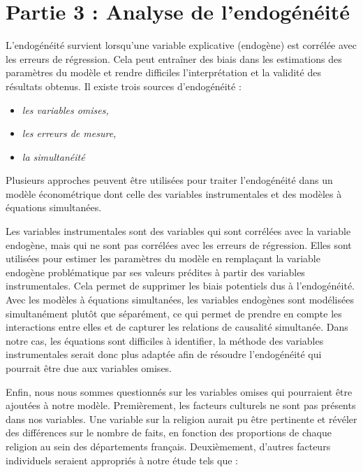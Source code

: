 \documentclass[
]{article}
\providecommand{\tightlist}{%
  \setlength{\itemsep}{0pt}\setlength{\parskip}{0pt}}
\begin{document}
\newpage

\hypertarget{partie-3-analyse-de-lendoguxe9nuxe9ituxe9}{%
\section{Partie 3 : Analyse de
l'endogénéité}\label{partie-3-analyse-de-lendoguxe9nuxe9ituxe9}}

L'endogénéité survient lorsqu'une variable explicative (endogène) est
corrélée avec les erreurs de régression. Cela peut entraîner des biais
dans les estimations des paramètres du modèle et rendre difficiles
l'interprétation et la validité des résultats obtenus. Il existe trois
sources d'endogénéité :

\begin{itemize}
\tightlist
\item
  \emph{les variables omises,}
\item
  \emph{les erreurs de mesure,}
\item
  \emph{la simultanéité}
\end{itemize}

Plusieurs approches peuvent être utilisées pour traiter l'endogénéité
dans un modèle économétrique dont celle des variables instrumentales et
des modèles à équations simultanées.

Les variables instrumentales sont des variables qui sont corrélées avec
la variable endogène, mais qui ne sont pas corrélées avec les erreurs de
régression. Elles sont utilisées pour estimer les paramètres du modèle
en remplaçant la variable endogène problématique par ses valeurs
prédites à partir des variables instrumentales. Cela permet de supprimer
les biais potentiels dus à l'endogénéité. Avec les modèles à équations
simultanées, les variables endogènes sont modélisées simultanément
plutôt que séparément, ce qui permet de prendre en compte les
interactions entre elles et de capturer les relations de causalité
simultanée. Dans notre cas, les équations sont difficiles à identifier,
la méthode des variables instrumentales serait donc plus adaptée afin de
résoudre l'endogénéité qui pourrait être due aux variables omises.

Enfin, nous nous sommes questionnés sur les variables omises qui
pourraient être ajoutées à notre modèle. Premièrement, les facteurs
culturels ne sont pas présents dans nos variables. Une variable sur la
religion aurait pu être pertinente et révéler des différences sur le
nombre de faits, en fonction des proportions de chaque religion au sein
des départements français. Deuxièmement, d'autres facteurs individuels
seraient appropriés à notre étude tels que :
\end{document}
